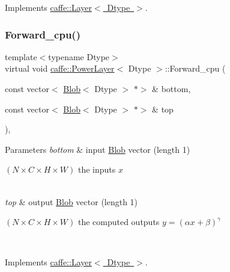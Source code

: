 Implements \mbox{\hyperlink{classcaffe_1_1_layer_a75c9b2a321dc713e0eaef530d02dc37f}{caffe\+::\+Layer$<$ Dtype $>$}}.

\mbox{\label{classcaffe_1_1_power_layer_abf30de2198baa2aa76ee85924feffa19}} 
\subsubsection{\texorpdfstring{Forward\+\_\+cpu()}{Forward\_cpu()}\hspace{0.1cm}{\footnotesize\ttfamily [1/2]}}
{\footnotesize\ttfamily template$<$typename Dtype$>$ \\
virtual void \mbox{\hyperlink{classcaffe_1_1_power_layer}{caffe\+::\+Power\+Layer}}$<$ Dtype $>$\+::Forward\+\_\+cpu (\begin{DoxyParamCaption}\item[{const vector$<$ \mbox{\hyperlink{classcaffe_1_1_blob}{Blob}}$<$ Dtype $>$ $\ast$$>$ \&}]{bottom,  }\item[{const vector$<$ \mbox{\hyperlink{classcaffe_1_1_blob}{Blob}}$<$ Dtype $>$ $\ast$$>$ \&}]{top }\end{DoxyParamCaption})\hspace{0.3cm}{\ttfamily [protected]}, {\ttfamily [virtual]}}


\begin{DoxyParams}{Parameters}
{\em bottom} & input \mbox{\hyperlink{classcaffe_1_1_blob}{Blob}} vector (length 1)
\begin{DoxyEnumerate}
\item $ (N \times C \times H \times W) $ the inputs $ x $ 
\end{DoxyEnumerate}\\
\hline
{\em top} & output \mbox{\hyperlink{classcaffe_1_1_blob}{Blob}} vector (length 1)
\begin{DoxyEnumerate}
\item $ (N \times C \times H \times W) $ the computed outputs $ y = (\alpha x + \beta) ^ \gamma $ 
\end{DoxyEnumerate}\\
\hline
\end{DoxyParams}


Implements \mbox{\hyperlink{classcaffe_1_1_layer_a576ac6a60b1e99fe383831f52a6cea77}{caffe\+::\+Layer$<$ Dtype $>$}}.

